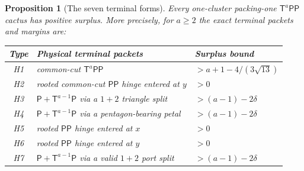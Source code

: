 \documentclass[11pt]{article}
\newtheorem{proposition}[theorem]{Proposition}
\theoremstyle{remark}
\newcommand{\T}{\mathsf T}
\newcommand{\Pp}{\mathsf P}
\begin{document}
\begin{proposition}[The seven terminal forms]\label{prop:H}
Every one-cluster packing-one $\T^a\Pp\Pp$ cactus has positive surplus.
More precisely, for $a\geq2$ the exact terminal packets and margins are:
\begin{center}
\begin{tabular}{@{}cll@{}}
\toprule
Type & Physical terminal packets & Surplus bound\\
\midrule
H1 & common-cut $\T^a\Pp\Pp$
   & $>a+1-4/(3\sqrt{13})$\\
H2 & rooted common-cut $\Pp\Pp$ hinge entered at $y$
   & $>0$\\
H3 & $\Pp+\T^{a-1}\Pp$ via a $1+2$ triangle split
   & $>(a-1)-2\delta$\\
H4 & $\Pp+\T^{a-1}\Pp$ via a pentagon-bearing petal
   & $>(a-1)-2\delta$\\
H5 & rooted $\Pp\Pp$ hinge entered at $x$
   & $>0$\\
H6 & rooted $\Pp\Pp$ hinge entered at $y$
   & $>0$\\
H7 & $\Pp+\T^{a-1}\Pp$ via a valid $1+2$ port split
   & $>(a-1)-2\delta$\\
\bottomrule
\end{tabular}
\end{center}
\end{proposition}
\end{document}

